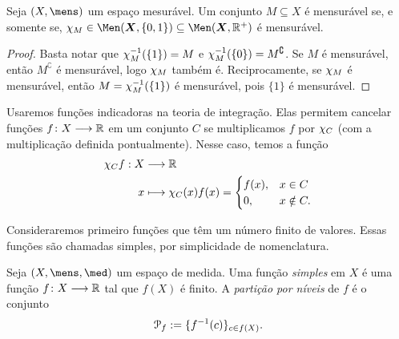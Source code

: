 \begin{prop}
Seja $(X,\mens)$ um espaço mesurável. Um conjunto $M \subseteq X$ é mensurável se, e somente se, $\idc_M \in \Men(\bm X,\{0,1\}) \subseteq \Men(\bm X,\R^+)$ é mensurável.
\end{prop}
\begin{proof}
Basta notar que $\chi_M^{-1}(\{1\}) = M$ e $\chi_M^{-1}(\{0\}) = M^\complement$. Se $M$ é mensurável, então $M^\complement$ é mensurável, logo $\chi_M$ também é. Reciprocamente, se $\chi_M$ é mensurável, então $M = \chi_M^{-1}(\{1\})$ é mensurável, pois $\{1\}$ é mensurável.
\end{proof}



Usaremos funções indicadoras na teoria de integração. Elas permitem cancelar funções $f\colon X \longrightarrow \mathbb{R}$ em um conjunto $C$ se multiplicamos $f$ por $\chi_C$ (com a multiplicação definida pontualmente). Nesse caso, temos a função
	\begin{align*}
	{\chi_Cf}: {X} &\longrightarrow {\mathbb{R}} \\{x} &\longmapsto {\chi_C(x)f(x)=
		\begin{cases}
			f(x),& x \in C \\
			0,& x \notin C.
		\end{cases}
	}
	\end{align*}

Consideraremos primeiro funções que têm um número finito de valores. Essas funções são chamadas simples, por simplicidade de nomenclatura.

\begin{defi}
Seja $(X,\mens,\med)$ um espaço de medida. Uma função \emph{simples} em $X$ é uma função $f\colon X \longrightarrow \mathbb{R}$ tal que $f(X)$ é finito. A \emph{partição por níveis} de $f$ é o conjunto
	\begin{equation*}
	\mathcal P_f := \{f^{-1}(c)\}_{c \in f(X)}.
	\end{equation*}
\end{defi}

